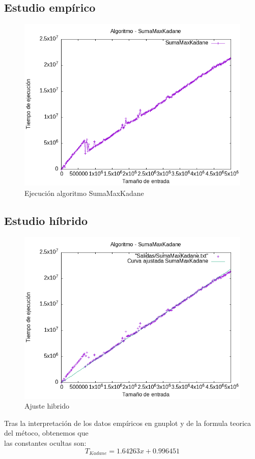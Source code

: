 \documentclass[11pt,openany]{book}
\begin{document}
\subsection{Estudio empírico}
\begin{center}
      \begin{figure}[H]
                  \centering
                  \includegraphics[width=0.7\linewidth]{assets/Img/SumaMaxKadane.png}
                  \caption{Ejecución algoritmo SumaMaxKadane}
                  \label{fig:SumaMaxKadane}
      \end{figure}
\end{center}
\subsection{Estudio híbrido}
\begin{center}
      \begin{figure}[H]
                  \centering
                  \includegraphics[width=0.7\linewidth]{assets/Img/SumaMaxKadane_hib.png}
                  \caption{Ajuste hibrido}
                  \label{fig:SumaMaxKadanehibrido}
      \end{figure}
\end{center}
Tras la interpretación de los datos empíricos en gnuplot y de la formula teorica del métoco, obtenemos que \\
las constantes ocultas son:
\begin{equation*}
      T_{Kadane}=1.64263x + 0.996451
\end{equation*}
\end{document}
